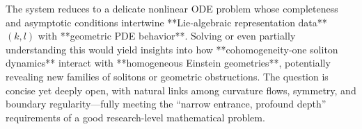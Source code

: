 The system reduces to a delicate nonlinear ODE problem whose completeness and asymptotic conditions intertwine **Lie‑algebraic representation data** \((k,l)\) with **geometric PDE behavior**. Solving or even partially understanding this would yield insights into how **cohomogeneity‑one soliton dynamics** interact with **homogeneous Einstein geometries**, potentially revealing new families of solitons or geometric obstructions.  
The question is concise yet deeply open, with natural links among curvature flows, symmetry, and boundary regularity—fully meeting the “narrow entrance, profound depth” requirements of a good research-level mathematical problem.